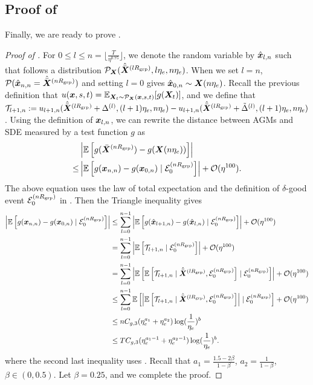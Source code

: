 \subsection{Proof of }\label{sec:proof-formal-SDE-approximation}
Finally, we are ready to prove .
\begin{proof}[Proof of ]
    For $0 \le l \le n=\lfloor\frac{T}{\eta^{0.75}}\rfloor$, we denote the random variable by $\hat{{\bm{x}}}_{l,n}$ such that follows a distribution $\mathcal{P}_{{\bm{X}}}(\hat{\bar{{\bm{X}}}}^{(lR_{\mathrm{grp}})},l\eta_e,n\eta_e)$. When we set $l=n$, $\mathcal{P}(\hat{{\bm{x}}}_{n,n}=\hat{\bar{{\bm{X}}}}^{(nR_{\mathrm{grp}})})$ and setting $l=0$ gives $\hat{{\bm{x}}}_{0,n} \sim {\bm{X}}(n\eta_e)$. Recall the previous definition that $u({\bm{x}},s,t)=\mathbb{E}_{{\bm{X}}_t \sim \mathcal{P}_{{\bm{X}}}({\bm{x}},s,t)}[g({\bm{X}}_t)]$, and we define that $\mathcal{T}_{l+1,n}:=u_{l+1,n}(\hat{\bar{{\bm{X}}}}^{(lR_{\mathrm{grp}})} + \Delta^{(l)},(l+1)\eta_e,n\eta_e)-u_{l+1,n}(\hat{\bar{{\bm{X}}}}^{(lR_{\mathrm{grp}})} + \tilde\Delta^{(l)},(l+1)\eta_e,n\eta_e)$. Using the definition of ${\bm{x}}_{l,n}$, we can rewrite the distance between AGMs and SDE measured by a test function $g$ as
    \begin{align*}
        &\left|\mathbb{E}\left[g(\bar{{\bm{X}}}^{(nR_{\mathrm{grp}})}) -g({\bm{X}}(n\eta_e))\right]\right|\\
        \le& \left|\mathbb{E}\left[g({\bm{x}}_{n,n}) -g({\bm{x}}_{0,n})\mid \mathcal{E}_0^{(nR_{\mathrm{grp}})}\right]\right| + \mathcal{O}(\eta^{100}).
    \end{align*}
    The above equation uses the law of total expectation and the definition of $\delta$-good event $\mathcal{E}_0^{(nR_{\mathrm{grp}})}$ in . Then the Triangle inequality gives 
    \begin{align*}
        \left|\mathbb{E}\left[g({\bm{x}}_{n,n}) -g({\bm{x}}_{0,n})\mid \mathcal{E}_0^{(nR_{\mathrm{grp}})}\right]\right| &\le  \sum_{l=0}^{n-1} \left|\mathbb{E}\left[g(\hat{{\bm{x}}}_{l+1,n}) -g(\hat{{\bm{x}}}_{l,n})\mid \mathcal{E}_0^{(nR_{\mathrm{grp}})}\right]\right| + \mathcal{O}(\eta^{100})\\
        &= \sum_{l=0}^{n-1} \left|\mathbb{E}\left[\mathcal{T}_{l+1,n}\mid \mathcal{E}_0^{(nR_{\mathrm{grp}})}\right]\right|+ \mathcal{O}(\eta^{100})\\
        &= \sum_{l=0}^{n-1} \left|\mathbb{E}\left[\mathbb{E}\left[\mathcal{T}_{l+1,n}\mid \hat{\bar{{\bm{X}}}}^{(lR_{\mathrm{grp}})}, \mathcal{E}_0^{(nR_{\mathrm{grp}})}\right] \mid  \mathcal{E}_0^{(nR_{\mathrm{grp}})}\right]\right|+ \mathcal{O}(\eta^{100})\\
        &\le \sum_{l=0}^{n-1} \mathbb{E}\left[\left|\mathbb{E}\left[\mathcal{T}_{l+1,n}\mid \hat{\bar{{\bm{X}}}}^{(lR_{\mathrm{grp}})}, \mathcal{E}_0^{(nR_{\mathrm{grp}})}\right]\right| \mid  \mathcal{E}_0^{(nR_{\mathrm{grp}})}\right]+ \mathcal{O}(\eta^{100})\\
        &\le n C_{g,3} (\eta_e^{a_1} + \eta_e^{a_2})\log(\frac{1}{\eta_e})^b\\
        &\le T C_{g,3} (\eta_e^{a_1-1} + \eta_e^{a_2-1})\log(\frac{1}{\eta_e})^b.
    \end{align*}
    where the second last inequality uses . Recall that $a_1 = \frac{1.5 -2 \beta}{1-\beta}$, $a_2 = \frac{1}{1-\beta}$, $\beta\in(0,0.5)$. Let $\beta = 0.25$, and we complete the proof.
\end{proof}

